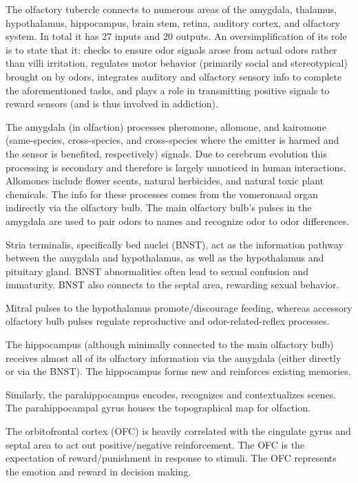 \documentclass[]{book}
\begin{document}
The olfactory tubercle connects to numerous areas of the amygdala, thalamus, hypothalamus, hippocampus, brain stem, retina, auditory cortex, and olfactory system. In total it has 27 inputs and 20 outputs. An oversimplification of its role is to state that it: checks to ensure odor signals arose from actual odors rather than villi irritation, regulates motor behavior (primarily social and stereotypical) brought on by odors, integrates auditory and olfactory sensory info to complete the aforementioned tasks, and plays a role in transmitting positive signals to reward sensors (and is thus involved in addiction).

The amygdala (in olfaction) processes pheromone, allomone, and kairomone (same-species, cross-species, and cross-species where the emitter is harmed and the sensor is benefited, respectively) signals. Due to cerebrum evolution this processing is secondary and therefore is largely unnoticed in human interactions. Allomones include flower scents, natural herbicides, and natural toxic plant chemicals. The info for these processes comes from the vomeronasal organ indirectly via the olfactory bulb. The main olfactory bulb's pulses in the amygdala are used to pair odors to names and recognize odor to odor differences.

Stria terminalis, specifically bed nuclei (BNST), act as the information pathway between the amygdala and hypothalamus, as well as the hypothalamus and pituitary gland. BNST abnormalities often lead to sexual confusion and immaturity. BNST also connects to the septal area, rewarding sexual behavior.

Mitral pulses to the hypothalamus promote/discourage feeding, whereas accessory olfactory bulb pulses regulate reproductive and odor-related-reflex processes.

The hippocampus (although minimally connected to the main olfactory bulb) receives almost all of its olfactory information via the amygdala (either directly or via the BNST). The hippocampus forms new and reinforces existing memories.

Similarly, the parahippocampus encodes, recognizes and contextualizes scenes. The parahippocampal gyrus houses the topographical map for olfaction.

The orbitofrontal cortex (OFC) is heavily correlated with the cingulate gyrus and septal area to act out positive/negative reinforcement. The OFC is the expectation of reward/punishment in response to stimuli. The OFC represents the emotion and reward in decision making.
\end{document}
